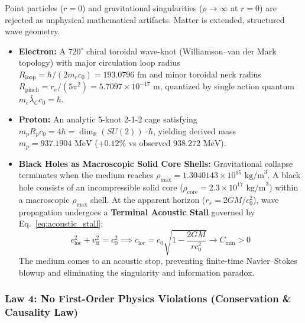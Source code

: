 \documentclass[11pt,a4paper]{article}
\begin{document}
Point particles ($r = 0$) and gravitational singularities ($\rho \to \infty$ at $r = 0$) are rejected as unphysical mathematical artifacts. Matter is extended, structured wave geometry.
\begin{itemize}
    \item \textbf{Electron:} A $720^\circ$ chiral toroidal wave-knot (Williamson--van der Mark topology) with major circulation loop radius $R_{\text{loop}} = \hbar / (2 m_e c_0) = 193.0796\text{ fm}$ and minor toroidal neck radius $R_{\text{pinch}} = r_e / (5\pi^2) = 5.7097 \times 10^{-17}\text{ m}$, quantized by single action quantum $m_e \bar{\lambda}_C c_0 = \hbar$.
    \item \textbf{Proton:} An analytic 5-knot 2-1-2 cage satisfying $m_p R_p c_0 = 4\hbar = \dim_{\mathbb{R}}(SU(2))\cdot\hbar$, yielding derived mass $m_p = 937.1904\text{ MeV}$ ($+0.12\%$ vs observed $938.272\text{ MeV}$).
    \item \textbf{Black Holes as Macroscopic Solid Core Shells:} Gravitational collapse terminates when the medium reaches $\rho_{\max} = 1.3040143 \times 10^{15}\text{ kg/m}^3$. A black hole consists of an incompressible solid core ($\rho_{\text{core}} = 2.3 \times 10^{17}\text{ kg/m}^3$) within a macroscopic $\rho_{\max}$ shell. At the apparent horizon ($r_s = 2GM/c_0^2$), wave propagation undergoes a \textbf{Terminal Acoustic Stall} governed by Eq.~\eqref{eq:acoustic_stall}:
    \begin{equation}
    c_{\text{loc}}^2 + v_{\text{ff}}^2 = c_0^2 \implies c_{\text{loc}} = c_0 \sqrt{1 - \frac{2GM}{r c_0^2}} \to C_{\min} > 0
    \label{eq:acoustic_stall}
    \end{equation}
    The medium comes to an acoustic stop, preventing finite-time Navier--Stokes blowup and eliminating the singularity and information paradox.
\end{itemize}

\subsubsection{Law 4: No First-Order Physics Violations (Conservation \& Causality Law)}
\label{subsubsec:law_4_no_violations}
\end{document}
